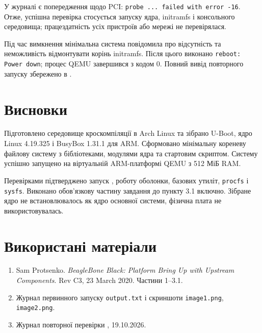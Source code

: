 \documentclass[12pt,a4paper]{article}
\begin{document}
У журналі є попередження щодо PCI: \texttt{probe ... failed with error -16}.
Отже, успішна перевірка стосується запуску ядра, initramfs і консольного
середовища; працездатність усіх пристроїв або мережі не перевірялася.

Під час вимкнення мінімальна система повідомила про відсутність
 та неможливість відмонтувати корінь initramfs.
Після цього виконано \texttt{reboot: Power down}; процес QEMU завершився
з кодом 0. Повний вивід повторного запуску збережено в
.
\section{Висновки}
Підготовлено середовище кроскомпіляції в Arch Linux та зібрано U-Boot,
ядро Linux 4.19.325 і BusyBox 1.31.1 для ARM. Сформовано мінімальну
кореневу файлову систему з бібліотеками, модулями ядра та стартовим скриптом.
Систему успішно запущено на віртуальній ARM-платформі QEMU з 512 МіБ RAM.

Перевірками підтверджено запуск , роботу оболонки,
базових утиліт, \texttt{procfs} і \texttt{sysfs}. Виконано обов'язкову
частину завдання до пункту 3.1 включно. Зібране ядро не встановлювалось
як ядро основної системи, фізична плата не використовувалась.
\section*{Використані матеріали}
\begin{enumerate}[leftmargin=*,nosep]
\item Sam Protsenko. \textit{BeagleBone Black: Platform Bring Up with Upstream Components}. Rev C3, 23 March 2020. Частини 1--3.1.
\item Журнал первинного запуску \texttt{output.txt} і скриншоти \texttt{image1.png}, \texttt{image2.png}.
\item Журнал повторної перевірки , 19.10.2026.
\end{enumerate}
\end{document}
